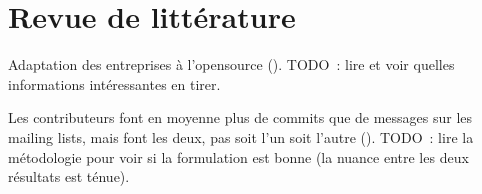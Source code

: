 \chapter{Revue de littérature}

Adaptation des entreprises à l'opensource (). TODO :
lire et voir quelles informations intéressantes en tirer.

Les contributeurs font en moyenne plus de commits que de messages sur les mailing
lists, mais font les deux, pas soit l'un soit l'autre
(). TODO : lire la métodologie pour voir si
la formulation est bonne (la nuance entre les deux résultats est ténue).
